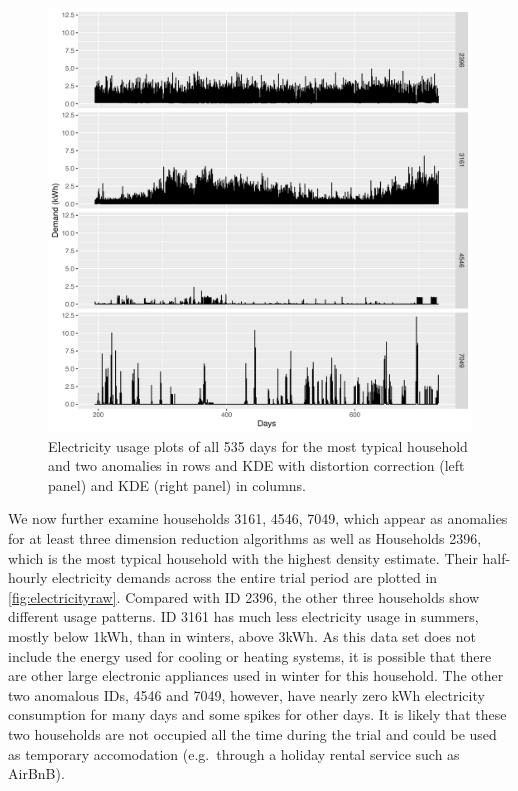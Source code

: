 \documentclass[11pt,a4paper,]{article}
\begin{document}
\begin{figure}

{\centering \includegraphics[width=0.9\linewidth]{figures/Electricity_2d_compare4id_1typical_3anomalous} 

}

\caption{Electricity usage plots of all 535 days for the most typical household and two anomalies in rows and KDE with distortion correction (left panel) and KDE (right panel) in columns.}\label{fig:electricityraw}
\end{figure}

We now further examine households 3161, 4546, 7049, which appear as anomalies for at least three dimension reduction algorithms as well as Households 2396, which is the most typical household with the highest density estimate. Their half-hourly electricity demands across the entire trial period are plotted in \autoref{fig:electricityraw}. Compared with ID 2396, the other three households show different usage patterns. ID 3161 has much less electricity usage in summers, mostly below 1kWh, than in winters, above 3kWh. As this data set does not include the energy used for cooling or heating systems, it is possible that there are other large electronic appliances used in winter for this household. The other two anomalous IDs, 4546 and 7049, however, have nearly zero kWh electricity consumption for many days and some spikes for other days. It is likely that these two households are not occupied all the time during the trial and could be used as temporary accomodation (e.g.~through a holiday rental service such as AirBnB).
\end{document}
